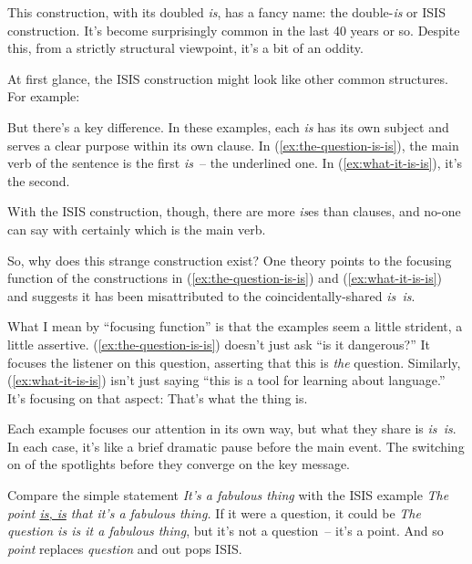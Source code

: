 This construction, with its doubled \textit{is}, has a fancy name: the double-\textit{is} or ISIS construction. It's become surprisingly common in the last 40 years or so. Despite this, from a strictly structural viewpoint, it's a bit of an oddity.

At first glance, the ISIS construction might look like other common structures. For example:

\ea 
 \label{ex:the-question-is-is}
 \label{ex:what-it-is-is}
 \z
\z

But there's a key difference. In these examples, each \textit{is} has its own subject and serves a clear purpose within its own clause. In (\ref{ex:the-question-is-is}), the main verb of the sentence is the first \textit{is}~-- the underlined one. In (\ref{ex:what-it-is-is}), it's the second.

With the ISIS construction, though, there are more \textit{is}es than clauses, and no-one can say with certainly which is the main verb.

\bigskip

So, why does this strange construction exist? One theory points to the focusing function of the constructions in (\ref{ex:the-question-is-is}) and (\ref{ex:what-it-is-is}) and suggests it has been misattributed to the coincidentally-shared \textit{is~is}.

What I mean by ``focusing function'' is that the examples seem a little strident, a little assertive. (\ref{ex:the-question-is-is}) doesn't just ask ``is it dangerous?'' It focuses the listener on this question, asserting that this is \textit{the} question. Similarly, (\ref{ex:what-it-is-is}) isn't just saying ``this is a tool for learning about language.'' It's focusing on that aspect: That's what the thing is.

Each example focuses our attention in its own way, but what they share is \textit{is~is}. In each case, it's like a brief dramatic pause before the main event. The switching on of the spotlights before they converge on the key message.

Compare the simple statement \textit{It's a fabulous thing} with the ISIS example \textit{The point \uline{is, is} that it's a fabulous thing.} If it were a question, it could be \textit{The question is \ob is it a fabulous thing\cb}, but it's not a question~-- it's a point. And so \textit{point} replaces \textit{question} and out pops ISIS.

